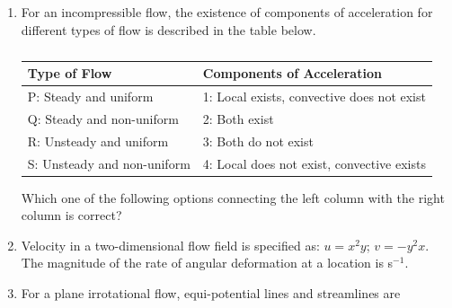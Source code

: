 \documentclass[a4paper,10pt]{article}
\begin{document}
\begin{enumerate}
    \item For an incompressible flow, the existence of components of acceleration for different types of flow is described in the table below.
    \begin{table}[h!] \centering \caption*{} \label{tab:q3_fluid}
        \begin{tabular}{ll} \hline
            \textbf{Type of Flow} & \textbf{Components of Acceleration} \\ \hline
            P: Steady and uniform & 1: Local exists, convective does not exist \\
            Q: Steady and non-uniform & 2: Both exist \\
            R: Unsteady and uniform & 3: Both do not exist \\
            S: Unsteady and non-uniform & 4: Local does not exist, convective exists \\ \hline
        \end{tabular}
    \end{table}
    Which one of the following options connecting the left column with the right column is correct?
    
    \hfill{}
    \begin{enumerate}
    \end{enumerate}

    \item Velocity in a two-dimensional flow field is specified as: $u = x^2y$; $v = -y^2x$. The magnitude of the rate of angular deformation at a location  is \underline{\hspace{2cm}} s$^{-1}$.
    
    \hfill{}

    \item For a plane irrotational flow, equi-potential lines and streamlines are
    
    \hfill{}
    \begin{enumerate}
    \end{enumerate}
    

\end{enumerate}
\end{document}
